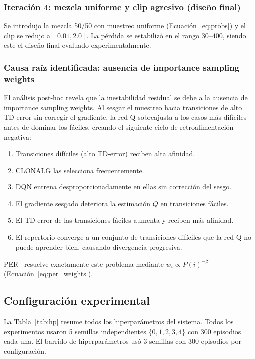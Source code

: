 \documentclass[12pt,a4paper]{article}
\begin{document}
\subsubsection{Iteración 4: mezcla uniforme y clip agresivo (diseño final)}
 
Se introdujo la mezcla 50/50 con muestreo uniforme (Ecuación~\ref{eq:probs})
y el clip se redujo a $[0.01, 2.0]$. La pérdida se estabilizó en el rango
$30$--$400$, siendo este el diseño final evaluado experimentalmente.
 
\subsubsection{Causa raíz identificada: ausencia de importance sampling weights}
 
El análisis post-hoc revela que la inestabilidad residual se debe a la
ausencia de importance sampling weights. Al sesgar el muestreo hacia
transiciones de alto TD-error sin corregir el gradiente, la red Q sobreajusta
a los casos más difíciles antes de dominar los fáciles, creando el siguiente
ciclo de retroalimentación negativa:
 
\begin{enumerate}[noitemsep]
  \item Transiciones difíciles (alto TD-error) reciben alta afinidad.
  \item CLONALG las selecciona frecuentemente.
  \item DQN entrena desproporcionadamente en ellas sin corrección del sesgo.
  \item El gradiente sesgado deteriora la estimación $Q$ en transiciones fáciles.
  \item El TD-error de las transiciones fáciles aumenta y reciben más afinidad.
  \item El repertorio converge a un conjunto de transiciones difíciles que
        la red Q no puede aprender bien, causando divergencia progresiva.
\end{enumerate}
 
PER~\cite{schaul2015per} resuelve exactamente este problema mediante
$w_i \propto P(i)^{-\beta}$ (Ecuación~\ref{eq:per_weights}).
 
\subsection{Configuración experimental}
 
La Tabla~\ref{tab:hp} resume todos los hiperparámetros del sistema. Todos
los experimentos usaron 5 semillas independientes $\{0,1,2,3,4\}$ con 300
episodios cada una. El barrido de hiperparámetros usó 3 semillas con 300
episodios por configuración.
 
\end{document}
